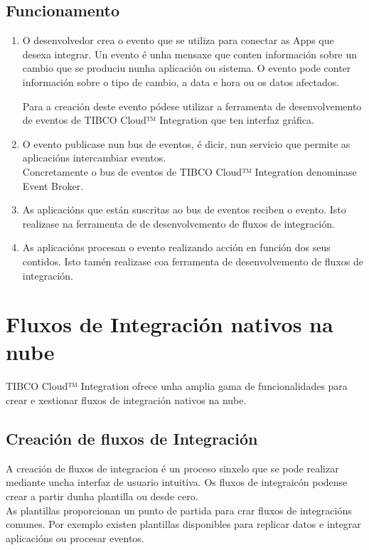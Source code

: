 \subsection{Funcionamento}

\begin{enumerate}
    \item O desenvolvedor crea o evento que se utiliza para conectar as Apps que desexa integrar. Un evento é unha mensaxe que conten información sobre un cambio que se produciu nunha aplicación ou sistema. O evento pode conter información sobre o tipo de cambio, a data e hora ou os datos afectados.
    
    Para a creación deste evento pódese utilizar a ferramenta de desenvolvemento de eventos de TIBCO Cloud™ Integration que ten interfaz gráfica.
    
    \item O evento publicase nun bus de eventos, é dicir, nun servicio que permite as aplicacións intercambiar eventos.\\
    Concretamente o bus de eventos de TIBCO Cloud™ Integration denominase Event Broker.
    \item As aplicacións que están suscritas ao bus de eventos reciben o evento. Isto realizase na ferramenta de de desenvolvemento de fluxos de integración.
    \item As aplicacións procesan o evento realizando acción en función dos seus contidos. Isto tamén realizase coa ferramenta de desenvolvemento de fluxos de integración.
\end{enumerate}

\section{Fluxos de Integración nativos na nube}

TIBCO Cloud™ Integration ofrece unha amplia gama de funcionalidades para crear e xestionar fluxos de integración nativos na nube.

\subsection{Creación de fluxos de Integración}

A creación de fluxos de integracion é un proceso sinxelo que se pode realizar mediante uncha interfaz de usuario intuitiva. Os fluxos de integraicón podense crear a partir dunha plantilla ou desde cero.\\
As plantillas proporcionan un punto de partida para crar fluxos de integracións comunes. Por exemplo existen plantillas disponibles para replicar datos e integrar aplicacións ou procesar eventos.

